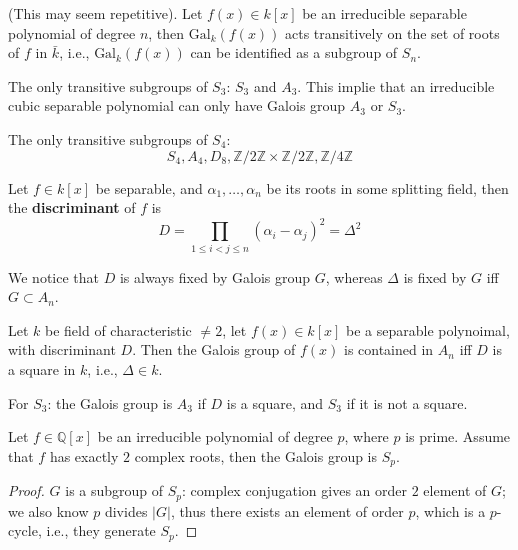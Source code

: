\documentclass[openany]{book}
\newcommand{\Z}{\mathbb{Z}}
\newcommand{\Q}{\mathbb{Q}}
\newcommand{\gal}{\text{Gal}}
\begin{document}
\begin{prop}
    (This may seem repetitive). Let $f(x)\in k[x]$ be an irreducible separable polynomial of degree $n$, then $\gal_k(f(x))$ acts transitively on the set of roots of $f$ in $\bar{k}$, i.e., $\gal_k(f(x))$ can be identified as a subgroup of $S_n$.
\end{prop}

\begin{example}
    The only transitive subgroups of $S_3$: $S_3$ and $A_3$. This implie that an irreducible cubic separable polynomial can only have Galois group $A_3$ or $S_3$.
\end{example}

\begin{example}
    The only transitive subgroups of $S_4$:
    \begin{equation*}
        S_4, A_4, D_8, \Z/2\Z\times\Z/2\Z, \Z/4\Z
    \end{equation*}
\end{example}
\begin{defn}[discriminant]
    Let $f\in k[x]$ be separable, and $\alpha_1,\dots,\alpha_n$ be its roots in some splitting field, then the \textbf{discriminant} of $f$ is 
    \begin{equation*}
        D=\prod_{1\leq i<j\leq n}(\alpha_i-\alpha_j)^2=\Delta^2
    \end{equation*}
\end{defn}
We notice that $D$ is always fixed by Galois group $G$, whereas $\Delta$ is fixed by $G$ iff $G\subset A_n$.

\begin{prop}
    Let $k$ be field of characteristic $\neq 2$, let $f(x)\in k[x]$ be a separable polynoimal, with discriminant $D$. Then the Galois group of $f(x)$ is contained in $A_n$ iff $D$ is a square in $k$, i.e., $\Delta\in k$.
\end{prop}

\begin{example}
    For $S_3$: the Galois group is $A_3$ if $D$ is a square, and $S_3$ if it is not a square. 
\end{example}



\begin{prop}
    Let $f\in\Q[x]$ be an irreducible polynomial of degree $p$, where $p$ is prime. Assume that $f$ has exactly $2$ complex roots, then the Galois group is $S_p$.
\end{prop}
\begin{proof}
    $G$ is a subgroup of $S_p$: complex conjugation gives an order $2$ element of $G$; we also know $p$ divides $|G|$, thus there exists an element of order $p$, which is a $p$-cycle, i.e., they generate $S_p$.
\end{proof}
\end{document}

